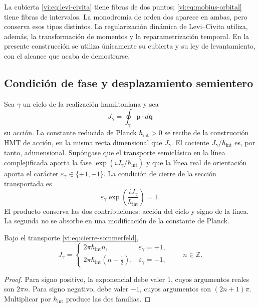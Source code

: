 La cubierta \eqref{vi:eq:levi-civita} tiene fibras de dos
puntos; \eqref{vi:eq:mobius-orbital} tiene fibras de
intervalos. La monodromía de orden dos aparece en ambas,
pero conserva esos tipos distintos. La regularización
dinámica de Levi--Civita utiliza, además, la transformación
de momentos y la reparametrización temporal. En la presente
construcción se utiliza únicamente su cubierta y su ley de
levantamiento, con el alcance que acaba de demostrarse.

\subsection{Condición de fase y desplazamiento semientero}
\label{vi:subsec:sommerfeld}

Sea $\gamma$ un ciclo de la realización hamiltoniana y sea
\begin{equation}
 J_\gamma=\oint_\gamma\mathbf p\cdot d\mathbf q
 \label{vi:eq:accion-ciclo}
\end{equation}
su acción. La constante reducida de Planck
$\hbar_{\mathrm{int}}>0$ se recibe de la construcción HMT
de acción, en la misma recta dimensional que $J_\gamma$.
El cociente $J_\gamma/\hbar_{\mathrm{int}}$ es, por tanto,
adimensional. Supóngase que el transporte semiclásico en la
línea complejificada aporta la fase
$\exp(iJ_\gamma/\hbar_{\mathrm{int}})$ y que la línea real
de orientación aporta el carácter
$\varepsilon_\gamma\in\{+1,-1\}$. La condición de cierre
de la sección transportada es
\begin{equation}
 \varepsilon_\gamma
       \exp\!\left(\frac{iJ_\gamma}{\hbar_{\mathrm{int}}}\right)=1.
 \label{vi:eq:cierre-sommerfeld}
\end{equation}
El producto conserva las dos contribuciones: acción del
ciclo y signo de la línea. La segunda no se absorbe en una
modificación de la constante de Planck.

\begin{theorem}
\label{vi:thm:sommerfeld}
Bajo el transporte \eqref{vi:eq:cierre-sommerfeld},
\begin{equation}
 J_\gamma=
 \begin{cases}
  2\pi\hbar_{\mathrm{int}}n,
          &\varepsilon_\gamma=+1,\\[1mm]
  2\pi\hbar_{\mathrm{int}}(n+\tfrac12),
          &\varepsilon_\gamma=-1,
 \end{cases}
 \qquad n\in\mathbb Z.
 \label{vi:eq:accion-sommerfeld}
\end{equation}
\end{theorem}
\begin{proof}
Para signo positivo, la exponencial debe valer $1$, cuyos
argumentos reales son $2\pi n$. Para signo negativo, debe
valer $-1$, cuyos argumentos son $(2n+1)\pi$. Multiplicar
por $\hbar_{\mathrm{int}}$ produce las dos familias.
\end{proof}

